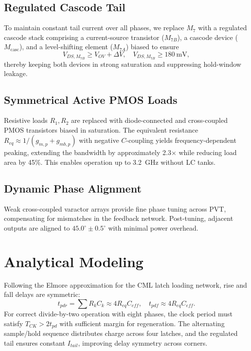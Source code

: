 \documentclass[journal]{IEEEtran}
\begin{document}
\subsection{Regulated Cascode Tail}
To maintain constant tail current over all phases, we replace $M_7$ with a regulated cascode stack comprising a current-source transistor ($M_{7B}$), a cascode device ($M_{\mathrm{casc}}$), and a level-shifting element ($M_{7A}$) biased to ensure
\begin{equation}
V_{DS,M_{7B}} \ge V_{OV} + \Delta V,\quad V_{DS,M_{7B}} \ge 180~\mathrm{mV},
\end{equation}
thereby keeping both devices in strong saturation and suppressing hold-window leakage.

\subsection{Symmetrical Active PMOS Loads}
Resistive loads $R_1,R_2$ are replaced with diode-connected and cross-coupled PMOS transistors biased in saturation. The equivalent resistance $R_{eq} \approx 1/(g_{m,p}+g_{mb,p})$ with negative $C$-coupling yields frequency-dependent peaking, extending the bandwidth by approximately 2.3$\times$ while reducing load area by 45\%. This enables operation up to 3.2~GHz without LC tanks.

\subsection{Dynamic Phase Alignment}
Weak cross-coupled varactor arrays provide fine phase tuning across PVT, compensating for mismatches in the feedback network. Post-tuning, adjacent outputs are aligned to $45.0^{\circ}\pm0.5^{\circ}$ with minimal power overhead.

\section{Analytical Modeling}
Following the Elmore approximation for the CML latch loading network, rise and fall delays are symmetric:
\begin{equation}
t_{pdr} = \sum R_k C_k \approx 4R_{eq}C_{eff},\quad t_{pdf} \approx 4R_{eq}C_{eff}.
\end{equation}
For correct divide-by-two operation with eight phases, the clock period must satisfy $T_{CK} > 2t_{pd}$ with sufficient margin for regeneration. The alternating sample/hold sequence distributes charge across four latches, and the regulated tail ensures constant $I_{tail}$, improving delay symmetry across corners.
\end{document}
